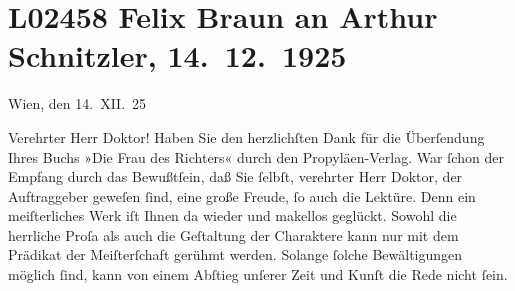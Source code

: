 

\section[Felix Braun an Arthur Schnitzler, 14. 12. 1925]{L02458 Felix Braun an Arthur Schnitzler, 14. 12. 1925}
\nopagebreak{}
\rehead{ }\normalsize\beginnumbering{}
\toendnotes[C]{\smallbreak\pagebreak[2]}
\toendnotes[C]{\smallbreak}
\toendnotes[C]{\smallbreak}
\pstart
           \centering{}{\pb}Wien, den 14. XII. 25\pend
           
\pstart{}Verehrter Herr Doktor!\pend\vspace{0.5em}
\pstart
           Haben Sie den herzlichſten Dank für die Überſendung Ihres Buchs »Die Frau des Richters« durch den Propyläen-Verlag. War{ }ſchon der Empfang durch das Bewußtſein, daß Sie{ }ſelbſt, verehrter Herr Doktor, der Auftraggeber geweſen{ }ſind, eine große Freude,{ }ſo
               auch die Lektüre. Denn ein meiſterliches Werk iſt Ihnen da wieder und makellos
               geglückt. Sowohl die herrliche Proſa als auch die Geſtaltung der Charaktere kann nur
               mit dem Prädikat der Meiſter{\pb}ſchaft gerühmt werden.
               Solange{ }ſolche Bewältigungen möglich{ }ſind, kann von einem Abſtieg unſerer Zeit und
               Kunſt die Rede nicht{ }ſein.\pend
           
